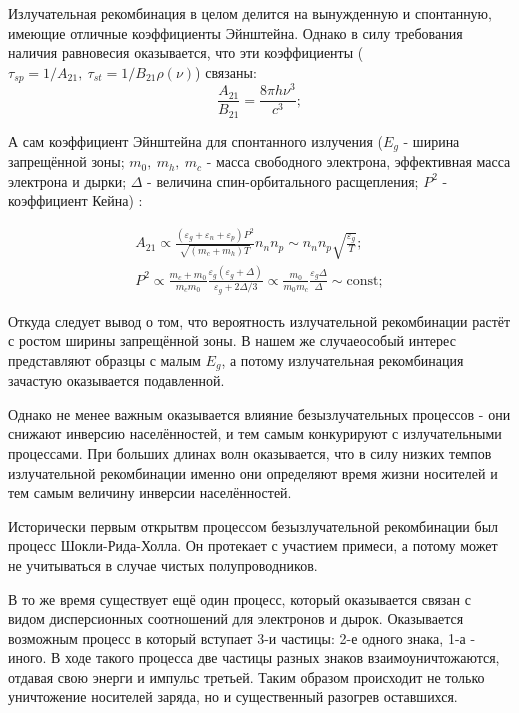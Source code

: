 \documentclass[../main.tex]{subfiles}
\begin{document}
    Излучательная рекомбинация в целом делится на вынужденную и спонтанную, имеющие
    отличные коэффициенты Эйнштейна. Однако в силу требования наличия равновесия 
    оказывается, что эти коэффициенты 
    ($\tau_{sp} = 1 / A_{21},~\tau_{st} = 1/B_{21} \rho(\nu)$) связаны:
    \begin{equation*}
        \frac{A_{21}}{B_{21}} = \frac{8\pi h \nu^3}{c^3};
    \end{equation*}

    А сам коэффициент Эйнштейна для спонтанного излучения 
    ($E_g$ - ширина запрещённой зоны; $m_0,~m_h,~m_c$ - масса свободного электрона,
    эффективная масса электрона и дырки; $\Delta$ - величина спин-орбитального 
    расщепления; $P^2$ - коэффициент Кейна) \cite{Asryan:IOP:2005}: 

    \begin{equation*}
        \begin{array}{l}
            A_{21} \propto \frac{(\varepsilon_g + \varepsilon_n + \varepsilon_p) P^2}
                {\sqrt{(m_c + m_h)T}} n_n n_p \sim n_n n_p \sqrt{\frac{\varepsilon_g}{T}} ;\\
            P^2 \propto \frac{m_c + m_0}{m_c m_0} \frac{\varepsilon_g(\varepsilon_g + \Delta)}
                {\varepsilon_g + 2 \Delta / 3} \propto \frac{m_0}{m_0 m_c} \frac{\varepsilon_g \Delta}{\Delta} \sim \text{const};
        \end{array}
    \end{equation*} 

    Откуда следует вывод о том, что вероятность излучательной рекомбинации растёт
    с ростом ширины запрещённой зоны. В нашем же случаеособый интерес представляют
    образцы с малым $E_g$, а потому излучательная рекомбинация зачастую оказывается
    подавленной.

    Однако не менее важным оказывается влияние безызлучательных процессов - они снижают
    инверсию населённостей, и тем самым конкурируют с излучательными процессами. При больших 
    длинах волн оказывается, что в силу низких темпов излучательной рекомбинации именно они
    определяют время жизни носителей и тем самым величину инверсии населённостей.

    Исторически первым открытвм процессом безызлучательной рекомбинации был процесс 
    Шокли-Рида-Холла. Он протекает с участием примеси, а потому может не учитываться 
    в случае чистых полупроводников.

    В то же время существует ещё один процесс, который оказывается связан с видом дисперсионных
    соотношений для электронов и дырок. Оказывается возможным процесс в который вступает
    3-и частицы: 2-е одного знака, 1-а - иного. В ходе такого процесса две частицы разных знаков
    взаимоуничтожаются, отдавая свою энерги и импульс третьей. Таким образом происходит не только
    уничтожение носителей заряда, но и существенный разогрев оставшихся. 
\end{document}
